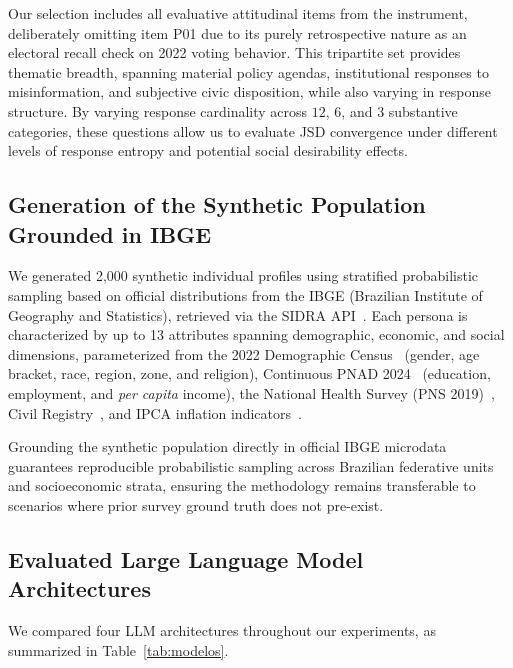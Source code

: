 Our selection includes all evaluative attitudinal items from the instrument,
deliberately omitting item P01 due to its purely retrospective nature as an
electoral recall check on 2022 voting behavior. This tripartite set provides
thematic breadth, spanning material policy agendas, institutional responses
to misinformation, and subjective civic disposition, while also varying in
response structure. By varying response cardinality across $12$, $6$, and
$3$ substantive categories, these questions allow us to evaluate JSD convergence under
different levels of response entropy and potential social desirability effects.

\subsection{Generation of the Synthetic Population Grounded in IBGE}
\label{subsec:silicon_profiles}

We generated 2,000 synthetic individual profiles using stratified
probabilistic sampling based on official distributions from the IBGE (Brazilian
Institute of Geography and Statistics), retrieved via the SIDRA
API~\cite{ibge_sidra_api}. Each persona is characterized by up to 13 attributes
spanning demographic, economic, and social dimensions, parameterized from the
2022 Demographic Census~\cite{ibge_censo_2022} (gender, age bracket, race,
region, zone, and religion), Continuous PNAD 2024~\cite{ibge_pnadc} (education,
employment, and \textit{per capita} income), the National Health Survey (PNS
2019)~\cite{ibge_pns_2019}, Civil Registry~\cite{ibge_registro_civil}, and
IPCA inflation indicators~\cite{ibge_ipca}.

Grounding the synthetic population directly in official IBGE microdata
guarantees reproducible probabilistic sampling across Brazilian federative units
and socioeconomic strata, ensuring the methodology remains transferable to
scenarios where prior survey ground truth does not pre-exist.

\subsection{Evaluated Large Language Model Architectures}
\label{subsec:language_models}

We compared four LLM architectures throughout our experiments, as summarized in
Table~\ref{tab:modelos}.

